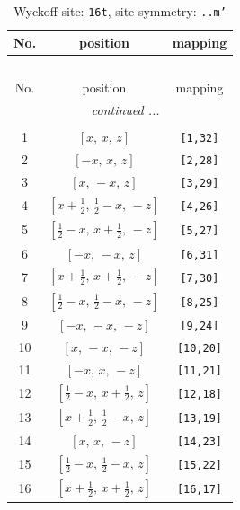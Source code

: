 \documentclass[fleqn,8pt]{jsarticle}
\begin{document}
\renewcommand{\arraystretch}{1.2}
\begin{longtable}{ccc}
\caption{Wyckoff site: {\tt 16t}, site symmetry: {\tt ..m'}}
 \\
 \hline \hline
No. & position & mapping \\ \hline \endfirsthead

\multicolumn{2}{l}{\tablename\ \thetable{}} \\
 \hline \hline
No. & position & mapping \\ \hline \endhead

 \hline \hline
\multicolumn{2}{r}{\footnotesize\it continued ...} \\ \endfoot

 \hline \hline
\multicolumn{2}{r}{} \\ \endlastfoot

1 & $\left[ x,\, x,\, z \right]$ & {\tt [1,32]} \\ \hline
2 & $\left[ - x,\, x,\, z \right]$ & {\tt [2,28]} \\ \hline
3 & $\left[ x,\, - x,\, z \right]$ & {\tt [3,29]} \\ \hline
4 & $\left[ x + \frac{1}{2},\, \frac{1}{2} - x,\, - z \right]$ & {\tt [4,26]} \\ \hline
5 & $\left[ \frac{1}{2} - x,\, x + \frac{1}{2},\, - z \right]$ & {\tt [5,27]} \\ \hline
6 & $\left[ - x,\, - x,\, z \right]$ & {\tt [6,31]} \\ \hline
7 & $\left[ x + \frac{1}{2},\, x + \frac{1}{2},\, - z \right]$ & {\tt [7,30]} \\ \hline
8 & $\left[ \frac{1}{2} - x,\, \frac{1}{2} - x,\, - z \right]$ & {\tt [8,25]} \\ \hline
9 & $\left[ - x,\, - x,\, - z \right]$ & {\tt [9,24]} \\ \hline
10 & $\left[ x,\, - x,\, - z \right]$ & {\tt [10,20]} \\ \hline
11 & $\left[ - x,\, x,\, - z \right]$ & {\tt [11,21]} \\ \hline
12 & $\left[ \frac{1}{2} - x,\, x + \frac{1}{2},\, z \right]$ & {\tt [12,18]} \\ \hline
13 & $\left[ x + \frac{1}{2},\, \frac{1}{2} - x,\, z \right]$ & {\tt [13,19]} \\ \hline
14 & $\left[ x,\, x,\, - z \right]$ & {\tt [14,23]} \\ \hline
15 & $\left[ \frac{1}{2} - x,\, \frac{1}{2} - x,\, z \right]$ & {\tt [15,22]} \\ \hline
16 & $\left[ x + \frac{1}{2},\, x + \frac{1}{2},\, z \right]$ & {\tt [16,17]} \\
\end{longtable}
\end{document}
